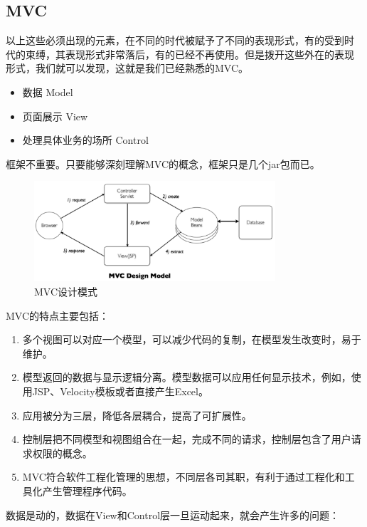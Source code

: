\subsection{MVC}

以上这些必须出现的元素，在不同的时代被赋予了不同的表现形式，有的受到时
代的束缚，其表现形式非常落后，有的已经不再使用。但是拨开这些外在的表现
形式，我们就可以发现，这就是我们已经熟悉的MVC。

\begin{itemize}
\item 数据  Model 
\item 页面展示  View 
\item 处理具体业务的场所  Control 
\end{itemize}

{\hei\Red 框架不重要。只要能够深刻理解MVC的概念，框架只是几个jar包而已。}

\begin{figure}[htb]
  \centering
  \includegraphics[width=0.8\textwidth]{images/Java-MVC-and-framework/MVC.pdf}
  \caption{MVC设计模式}
  \label{fig:mvc}
\end{figure}

MVC的特点主要包括：

\begin{enumerate}
\item 多个视图可以对应一个模型，可以减少代码的复制，在模型发生改变时，易于维护。
\item 模型返回的数据与显示逻辑分离。模型数据可以应用任何显示技术，例如，使用JSP、Velocity模板或者直接产生Excel。
\item 应用被分为三层，降低各层耦合，提高了可扩展性。
\item 控制层把不同模型和视图组合在一起，完成不同的请求，控制层包含了用户请求权限的概念。
\item MVC符合软件工程化管理的思想，不同层各司其职，有利于通过工程化和工具化产生管理程序代码。
\end{enumerate}



数据是动的，数据在View和Control层一旦运动起来，就会产生许多的问题：

